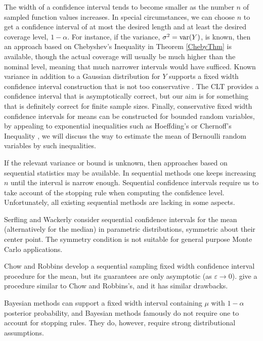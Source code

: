 \documentclass{iitthesis}
\theoremstyle{definition}
\begin{document}
The width of a confidence interval tends to become smaller as the number $n$ of sampled
function values increases. In special circumstances, we can choose $n$ to get a confidence interval of at most the desired length and at least the desired coverage level, $1-\alpha$. For instance, if the variance, $\sigma^2=\operatorname{var}(Y)$, is known, then an approach based on Chebyshev's Inequality in Theorem \ref{ChebyThm} is available, though the actual coverage will usually be much higher than the nominal level, meaning that much narrower intervals would have sufficed. Known variance in addition to a Gaussian distribution for $Y$ supports a fixed width confidence interval construction that is not too conservative \cite{stein45}. The CLT provides a confidence interval that is asymptotically correct, but our aim is for something that is definitely correct for finite sample sizes. Finally, conservative fixed width confidence intervals for means can be constructed for bounded random variables, by appealing to exponential inequalities such as Hoeffding's \cite{H63} or Chernoff's Inequality \cite{Chernoff52}, we will discuss the way to estimate the mean of Bernoulli random variables by such inequalities.

If the relevant variance or bound is unknown, then approaches based on sequential statistics \cite{Siegmund85} may be available.  In sequential methods one keeps increasing $n$ until the interval is narrow enough. Sequential confidence intervals require us to take account of the stopping rule when computing the confidence level. Unfortunately, all existing sequential methods are lacking in some aspects. 

Serfling and Wackerly \cite{SerflingaWackerlyb76} consider sequential confidence intervals for the mean (alternatively for the median) in parametric distributions, symmetric about their center point. The symmetry condition is not suitable for general purpose Monte Carlo applications.

Chow and Robbins\cite{ChowRobbins65} develop a sequential sampling fixed width confidence interval procedure for the mean, but its guarantees are only asymptotic (as $\varepsilon \to 0$). \cite{MukhDatta96} give a procedure similar to Chow and Robbins's, and it has similar drawbacks.

Bayesian methods can support a fixed width interval containing $\mu$ with $1-\alpha$ posterior probability, and
Bayesian methods famously do not require one to account for stopping rules. They do, however, require strong distributional assumptions.
\end{document}
